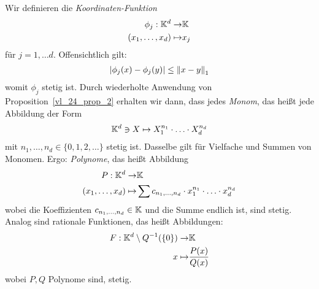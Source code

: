 \begin{Beispiel*}
	Wir definieren die \emph{Koordinaten-Funktion}
	\begin{align*}
		\phi_j : \mathbb{K}^d \rightarrow & \mathbb{K} \\
			(x_1, \hdots, x_d) \mapsto & x_j
	\end{align*}
	für $j = 1, \hdots d$. Offensichtlich gilt: 
	\begin{align*}
		\abs{\phi_j(x)-\phi_j(y)} \leq \norm{x-y}_1
	\end{align*}
	womit $\phi_j$ stetig ist. Durch wiederholte Anwendung von 
	Proposition~\ref{vl_24_prop_2} erhalten wir dann, dass jedes \emph{Monom}, 
	das heißt jede Abbildung der Form 
	\begin{align*}
		\mathbb{K}^d \owns X \mapsto X_1^{n_1} \cdot \hdots \cdot X_d^{n_d}
	\end{align*}
	mit $n_1, \hdots , n_d \in \{0,1,2,\hdots \}$ stetig ist.
	Dasselbe gilt für Vielfache und Summen von Monomen. Ergo: \emph{Polynome}, das heißt 
	Abbildung
	\begin{align*}
		P: \mathbb{K}^d \rightarrow & \mathbb{K} \\
		(x_1, \hdots, x_d) \mapsto & \sum c_{n_1, \hdots, n_d} \cdot x_1^{n_1}\cdot 
		\hdots \cdot x_d^{n_d}
	\end{align*}
	wobei die Koeffizienten $c_{n_1,\hdots, n_d} \in \mathbb{K}$ und die Summe endlich ist, 
	sind stetig. Analog sind rationale Funktionen, das heißt Abbildungen:
	\begin{align*}
		F: \mathbb{K}^d \setminus Q^{-1}(\{0\}) \rightarrow & \mathbb{K} \\
		x \mapsto & \frac{P(x)}{Q(x)}
	\end{align*}
	wobei $P,Q$ Polynome sind, stetig.
\end{Beispiel*}